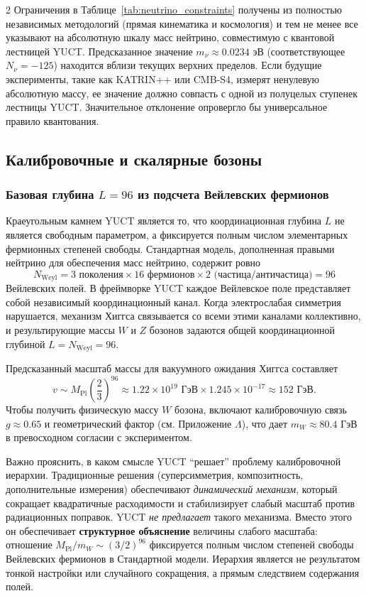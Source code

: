\documentclass[11pt,a4paper]{article}
\begin{document}
\begin{multicols}{2}
		Ограничения в Таблице~\ref{tab:neutrino_constraints} получены из полностью независимых методологий (прямая кинематика и космология) и тем не менее все указывают на абсолютную шкалу масс нейтрино, совместимую с квантовой лестницей YUCT. Предсказанное значение $m_\nu \approx 0.0234$ эВ (соответствующее $N_\nu = -125$) находится вблизи текущих верхних пределов. Если будущие эксперименты, такие как KATRIN++ или CMB-S4, измерят ненулевую абсолютную массу, ее значение должно совпасть с одной из полуцелых ступенек лестницы YUCT. Значительное отклонение опровергло бы универсальное правило квантования.
		
		\subsection{Калибровочные и скалярные бозоны}
		
		\subsubsection{Базовая глубина $L=96$ из подсчета Вейлевских фермионов}
		
		Краеугольным камнем YUCT является то, что координационная глубина $L$ не является свободным параметром, а фиксируется полным числом элементарных фермионных степеней свободы. Стандартная модель, дополненная правыми нейтрино для обеспечения масс нейтрино, содержит ровно
		\scriptsize
		\[
		N_{\text{Weyl}} = 3 \text{ поколения} \times 16 \text{ фермионов} \times 2 \text{ (частица/античастица)} = 96
		\]
		\small
		Вейлевских полей. В фреймворке YUCT каждое Вейлевское поле представляет собой независимый координационный канал. Когда электрослабая симметрия нарушается, механизм Хиггса связывается со всеми этими каналами коллективно, и результирующие массы $W$ и $Z$ бозонов задаются общей координационной глубиной $L = N_{\text{Weyl}} = 96$.
		
		Предсказанный масштаб массы для вакуумного ожидания Хиггса составляет
		\begin{equation}
			v \sim M_{\mathrm{Pl}} \left( \frac{2}{3} \right)^{96} \approx 1.22 \times 10^{19} \text{ ГэВ} \times 1.245\times10^{-17} \approx 152 \text{ ГэВ}.
		\end{equation}
		Чтобы получить физическую массу $W$ бозона, включают калибровочную связь $g \approx 0.65$ и геометрический фактор (см. Приложение $\Lambda$), что дает $m_W \approx 80.4$ ГэВ в превосходном согласии с экспериментом.
		
		Важно прояснить, в каком смысле YUCT ``решает'' проблему калибровочной иерархии. Традиционные решения (суперсимметрия, композитность, дополнительные измерения) обеспечивают \emph{динамический механизм}, который сокращает квадратичные расходимости и стабилизирует слабый масштаб против радиационных поправок. YUCT \emph{не предлагает} такого механизма. Вместо этого он обеспечивает \textbf{структурное объяснение} величины слабого масштаба: отношение \(M_{\mathrm{Pl}}/m_W \sim (3/2)^{96}\) фиксируется полным числом степеней свободы Вейлевских фермионов в Стандартной модели. Иерархия является не результатом тонкой настройки или случайного сокращения, а прямым следствием содержания полей.
		

\end{multicols}
\end{document}
